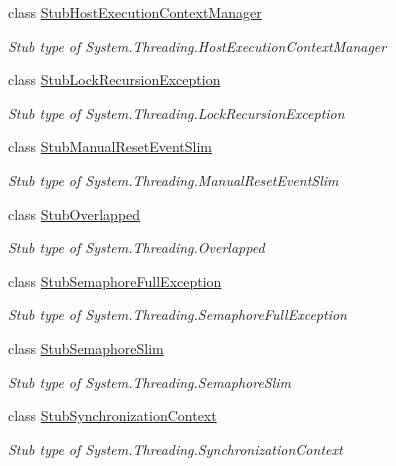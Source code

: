 \begin{DoxyCompactItemize}
class \hyperlink{class_system_1_1_threading_1_1_fakes_1_1_stub_host_execution_context_manager}{Stub\-Host\-Execution\-Context\-Manager}
\begin{DoxyCompactList}\small\item\em Stub type of System.\-Threading.\-Host\-Execution\-Context\-Manager\end{DoxyCompactList}\item 
class \hyperlink{class_system_1_1_threading_1_1_fakes_1_1_stub_lock_recursion_exception}{Stub\-Lock\-Recursion\-Exception}
\begin{DoxyCompactList}\small\item\em Stub type of System.\-Threading.\-Lock\-Recursion\-Exception\end{DoxyCompactList}\item 
class \hyperlink{class_system_1_1_threading_1_1_fakes_1_1_stub_manual_reset_event_slim}{Stub\-Manual\-Reset\-Event\-Slim}
\begin{DoxyCompactList}\small\item\em Stub type of System.\-Threading.\-Manual\-Reset\-Event\-Slim\end{DoxyCompactList}\item 
class \hyperlink{class_system_1_1_threading_1_1_fakes_1_1_stub_overlapped}{Stub\-Overlapped}
\begin{DoxyCompactList}\small\item\em Stub type of System.\-Threading.\-Overlapped\end{DoxyCompactList}\item 
class \hyperlink{class_system_1_1_threading_1_1_fakes_1_1_stub_semaphore_full_exception}{Stub\-Semaphore\-Full\-Exception}
\begin{DoxyCompactList}\small\item\em Stub type of System.\-Threading.\-Semaphore\-Full\-Exception\end{DoxyCompactList}\item 
class \hyperlink{class_system_1_1_threading_1_1_fakes_1_1_stub_semaphore_slim}{Stub\-Semaphore\-Slim}
\begin{DoxyCompactList}\small\item\em Stub type of System.\-Threading.\-Semaphore\-Slim\end{DoxyCompactList}\item 
class \hyperlink{class_system_1_1_threading_1_1_fakes_1_1_stub_synchronization_context}{Stub\-Synchronization\-Context}
\begin{DoxyCompactList}\small\item\em Stub type of System.\-Threading.\-Synchronization\-Context\end{DoxyCompactList}\item 

\end{DoxyCompactItemize}
